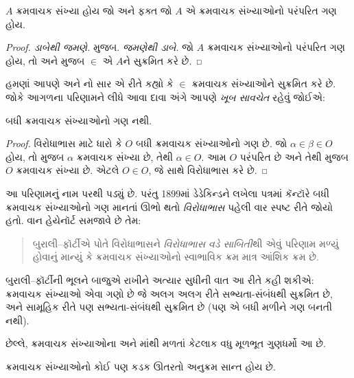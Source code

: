 \begin{cor}
$A$ ક્રમવાચક સંખ્યા હોય જો અને ફક્ત જો
$A$ એ ક્રમવાચક સંખ્યાઓનો પરંપરિત ગણ હોય.
\end{cor}

\begin{proof}
\emph{ડાબેથી જમણે.}  મુજબ.
\emph{જમણેથી ડાબે.}
જો $A$ ક્રમવાચક સંખ્યાઓનો પરંપરિત
ગણ હોય, તો
 અને
 મુજબ
$\in$ એ $A$ને સુક્રમિત કરે છે.
\end{proof}

હમણાં આપણે 
અને નો સાર એ રીતે
કહ્યો કે $\in$ ક્રમવાચક સંખ્યાઓને
સુક્રમિત કરે છે. જોકે આગળના પરિણામને
લીધે આવા દાવા અંગે આપણે \emph{ખૂબ સાવચેત}
રહેવું જોઈએ:

\begin{thm}[બુરાલી–ફૉર્ટીનો વિરોધાભાસ]
બધી ક્રમવાચક સંખ્યાઓનો ગણ નથી.
\end{thm}

\begin{proof}
વિરોધાભાસ માટે ધારો કે $O$ બધી
ક્રમવાચક સંખ્યાઓનો ગણ છે.
જો $\alpha \in
\beta \in O$ હોય, તો
 મુજબ $\alpha$
ક્રમવાચક સંખ્યા છે, તેથી
$\alpha \in O$.
આમ $O$ પરંપરિત છે અને તેથી
 મુજબ
$O$ ક્રમવાચક સંખ્યા છે.
એટલે $O \in O$, જે
 સાથે વિરોધાભાસ કરે છે.
\end{proof}
\noindent
આ પરિણામનું નામ \citeauthor{Burali-Forti1897}
પરથી પડ્યું છે. પરંતુ 1899માં ડેડેકિન્ડને
લખેલા પત્રમાં કૅન્ટૉરે બધી ક્રમવાચક
સંખ્યાઓનો ગણ માનતાં ઊભો થતો
\emph{વિરોધાભાસ} પહેલી વાર સ્પષ્ટ રીતે
જોયો હતો. વાન હેયેનૉર્ટ સમજાવે છે તેમ:
\begin{quote}
  બુરાલી–ફૉર્ટીએ પોતે વિરોધાભાસને
  \emph{વિરોધાભાસ વડે સાબિતી}થી
  એવું પરિણામ મળ્યું હોવાનું માન્યું કે
  ક્રમવાચક સંખ્યાઓનો સ્વાભાવિક ક્રમ
  માત્ર આંશિક ક્રમ છે.
  \citep[p.~105]{Heijenoort1967}
\end{quote}
બુરાલી–ફૉર્ટીની ભૂલને બાજુએ રાખીને
અત્યાર સુધીની વાત આ રીતે કહી શકીએ:
ક્રમવાચક સંખ્યાઓ એવા ગણો છે જે
અલગ અલગ રીતે સભ્યતા-સંબંધથી
સુક્રમિત છે, અને સામૂહિક રીતે પણ
સભ્યતા-સંબંધથી સુક્રમિત છે
(પણ એ બધી મળીને ગણ બનતી નથી).

છેલ્લે, ક્રમવાચક સંખ્યાઓના
 અને
માંથી મળતાં
કેટલાક વધુ મૂળભૂત ગુણધર્મો આ છે.

\begin{prop}
ક્રમવાચક સંખ્યાઓનો કોઈ પણ કડક
ઊતરતો અનુક્રમ સાન્ત હોય છે.
\end{prop}

